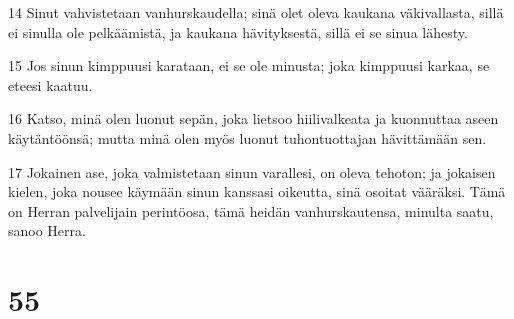 \par 14 Sinut vahvistetaan vanhurskaudella; sinä olet oleva kaukana väkivallasta, sillä ei sinulla ole pelkäämistä, ja kaukana hävityksestä, sillä ei se sinua lähesty.
\par 15 Jos sinun kimppuusi karataan, ei se ole minusta; joka kimppuusi karkaa, se eteesi kaatuu.
\par 16 Katso, minä olen luonut sepän, joka lietsoo hiilivalkeata ja kuonnuttaa aseen käytäntöönsä; mutta minä olen myös luonut tuhontuottajan hävittämään sen.
\par 17 Jokainen ase, joka valmistetaan sinun varallesi, on oleva tehoton; ja jokaisen kielen, joka nousee käymään sinun kanssasi oikeutta, sinä osoitat vääräksi. Tämä on Herran palvelijain perintöosa, tämä heidän vanhurskautensa, minulta saatu, sanoo Herra.

\chapter{55}

